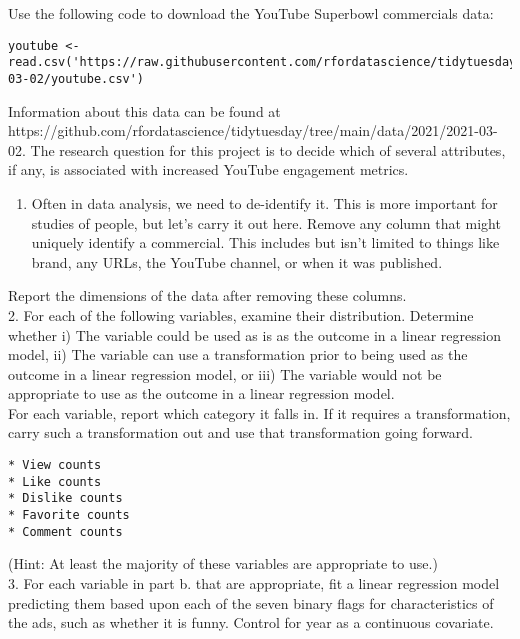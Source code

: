 \documentclass[
  letterpaper,
  DIV=11,
  numbers=noendperiod]{scrartcl}
\providecommand{\tightlist}{%
  \setlength{\itemsep}{0pt}\setlength{\parskip}{0pt}}
\begin{document}
Use the following code to download the YouTube Superbowl commercials
data:

\begin{verbatim}
youtube <- read.csv('https://raw.githubusercontent.com/rfordatascience/tidytuesday/master/data/2021/2021-03-02/youtube.csv')  
\end{verbatim}

Information about this data can be found at
https://github.com/rfordatascience/tidytuesday/tree/main/data/2021/2021-03-02.
The research question for this project is to decide which of several
attributes, if any, is associated with increased YouTube engagement
metrics.

\begin{enumerate}
\def\labelenumi{\arabic{enumi}.}
\tightlist
\item
  Often in data analysis, we need to de-identify it. This is more
  important for studies of people, but let's carry it out here. Remove
  any column that might uniquely identify a commercial. This includes
  but isn't limited to things like brand, any URLs, the YouTube channel,
  or when it was published.
\end{enumerate}

Report the dimensions of the data after removing these columns.\\
2. For each of the following variables, examine their distribution.
Determine whether i) The variable could be used as is as the outcome in
a linear regression model, ii) The variable can use a transformation
prior to being used as the outcome in a linear regression model, or iii)
The variable would not be appropriate to use as the outcome in a linear
regression model.\\
For each variable, report which category it falls in. If it requires a
transformation, carry such a transformation out and use that
transformation going forward.

\begin{verbatim}
* View counts  
* Like counts  
* Dislike counts  
* Favorite counts  
* Comment counts
\end{verbatim}

(Hint: At least the majority of these variables are appropriate to
use.)\\
3. For each variable in part b. that are appropriate, fit a linear
regression model predicting them based upon each of the seven binary
flags for characteristics of the ads, such as whether it is funny.
Control for year as a continuous covariate.
\end{document}
